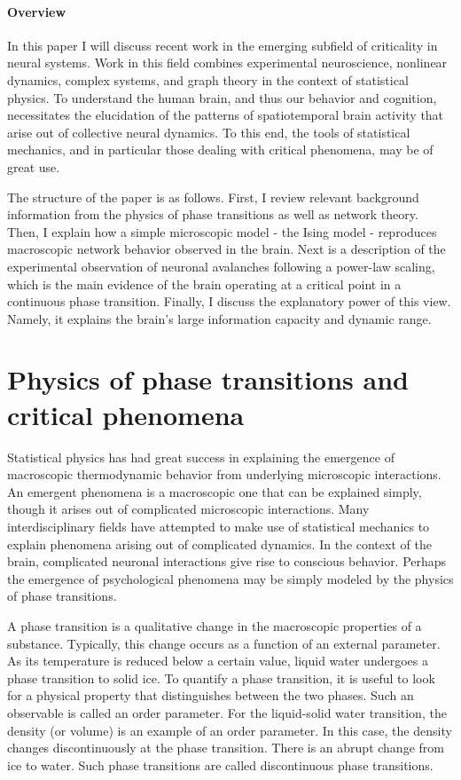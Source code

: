 \documentclass[12pt]{article}
\begin{document}
\paragraph*{Overview} In this paper I will discuss recent work in the emerging subfield of criticality in neural systems. Work in this field combines experimental neuroscience, nonlinear dynamics, complex systems, and graph theory in the context of statistical physics. To understand the human brain, and thus our behavior and cognition, necessitates the elucidation of the patterns of spatiotemporal brain activity that arise out of collective neural dynamics. To this end, the tools of statistical mechanics, and in particular those dealing with critical phenomena, may be of great use.

The structure of the paper is as follows. First, I review relevant background information from the physics of phase transitions as well as network theory. Then, I explain how a simple microscopic model - the Ising model - reproduces macroscopic network behavior observed in the brain. Next is a description of the experimental observation of neuronal avalanches following a power-law scaling, which is the main evidence of the brain operating at a critical point in a continuous phase transition. Finally, I discuss the explanatory power of this view. Namely, it explains the brain's large information capacity and dynamic range.

\section*{Physics of phase transitions and critical phenomena}

Statistical physics has had great success in explaining the emergence of macroscopic thermodynamic behavior from underlying microscopic interactions. An emergent phenomena is a macroscopic one that can be explained simply, though it arises out of complicated microscopic interactions. Many interdisciplinary fields have attempted to make use of statistical mechanics to explain phenomena arising out of complicated dynamics. In the context of the brain, complicated neuronal interactions give rise to conscious behavior. Perhaps the emergence of psychological phenomena may be simply modeled by the physics of phase transitions.

A phase transition is a qualitative change in the macroscopic properties of a substance. Typically, this change occurs as a function of an external parameter. As its temperature is reduced below a certain value, liquid water undergoes a phase transition to solid ice. To quantify a phase transition, it is useful to look for a physical property that distinguishes between the two phases. Such an observable is called an order parameter. For the liquid-solid water transition, the density (or volume) is an example of an order parameter. In this case, the density changes discontinuously at the phase transition. There is an abrupt change from ice to water. Such phase transitions are called discontinuous phase transitions.
\end{document}
